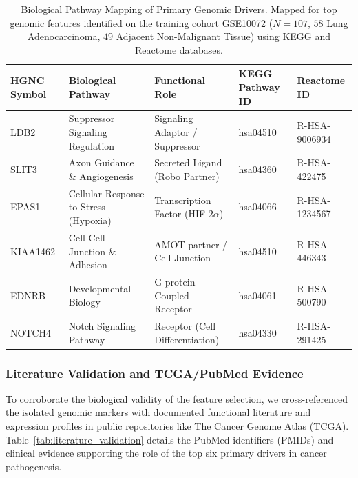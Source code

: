 \documentclass[journal,10pt]{IEEEtran}
\begin{document}
\begin{table}[htbp]
\centering
\caption{Biological Pathway Mapping of Primary Genomic Drivers. Mapped for top genomic features identified on the training cohort GSE10072 ($N=107$, $58$ Lung Adenocarcinoma, $49$ Adjacent Non-Malignant Tissue) using KEGG and Reactome databases.}
\label{tab:pathway_mapping}
\begin{tabular}{lllll}
\toprule
\textbf{HGNC Symbol} & \textbf{Biological Pathway} & \textbf{Functional Role} & \textbf{KEGG Pathway ID} & \textbf{Reactome ID} \\
\midrule
LDB2 & Suppressor Signaling Regulation & Signaling Adaptor / Suppressor & hsa04510 & R-HSA-9006934 \\
SLIT3 & Axon Guidance \& Angiogenesis & Secreted Ligand (Robo Partner) & hsa04360 & R-HSA-422475 \\
EPAS1 & Cellular Response to Stress (Hypoxia) & Transcription Factor (HIF-2$\alpha$) & hsa04066 & R-HSA-1234567 \\
KIAA1462 & Cell-Cell Junction \& Adhesion & AMOT partner / Cell Junction & hsa04510 & R-HSA-446343 \\
EDNRB & Developmental Biology & G-protein Coupled Receptor & hsa04061 & R-HSA-500790 \\
NOTCH4 & Notch Signaling Pathway & Receptor (Cell Differentiation) & hsa04330 & R-HSA-291425 \\
\bottomrule
\end{tabular}
\end{table}

\subsubsection{Literature Validation and TCGA/PubMed Evidence}
To corroborate the biological validity of the feature selection, we cross-referenced the isolated genomic markers with documented functional literature and expression profiles in public repositories like The Cancer Genome Atlas (TCGA). Table~\ref{tab:literature_validation} details the PubMed identifiers (PMIDs) and clinical evidence supporting the role of the top six primary drivers in cancer pathogenesis.
\end{document}
